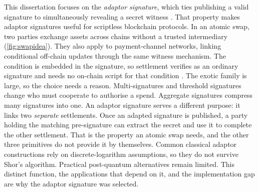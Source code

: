 This dissertation focuses on the \emph{adaptor signature}, which ties publishing
a valid signature to simultaneously revealing a secret witness
\cite{poelstra2017,aumayr2021generalized}. That property makes adaptor signatures useful
for scriptless blockchain protocols. In an atomic swap, two parties exchange assets across
chains without a trusted intermediary (\cref{fig:swapidea}). They also apply to payment-channel
networks, linking conditional off-chain updates through the same
witness mechanism. The condition is embedded in the signature, so settlement verifies as
an ordinary signature and needs no on-chain script for that condition
\cite{esgin2020post,buser2023survey}. The exotic family is large, so the choice needs a
reason. Multi-signatures and threshold signatures change who must cooperate to authorise
a spend. Aggregate signatures compress many signatures into one. An adaptor signature
serves a different purpose: it links two \emph{separate} settlements. Once an adapted
signature is published, a party holding the matching pre-signature can extract the secret
and use it to complete the other settlement. That is the property an atomic swap needs,
and the other three primitives do not provide it by themselves. Common classical adaptor
constructions rely on discrete-logarithm assumptions, so they do not survive Shor's
algorithm. Practical post-quantum alternatives remain limited. This distinct function,
the applications that depend on it, and the implementation gap are why the adaptor
signature was selected.

